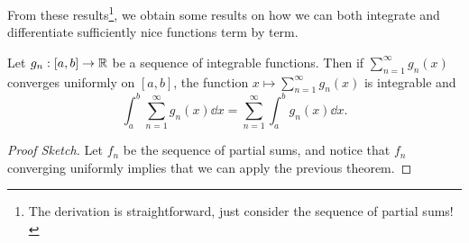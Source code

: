 \documentclass[a4paper]{scrartcl}
\begin{document}
From these results\footnote{The derivation is straightforward, just consider the sequence of partial sums!}, we obtain some results on how we can both integrate and differentiate sufficiently nice functions term by term.

\begin{theorem}
    Let $g_n: [a, b] \rightarrow \mathbb{R}$ be a sequence of integrable functions. Then if $\sum_{n = 1}^{\infty} g_n(x)$ converges uniformly on $[a, b]$, the function $x \mapsto \sum_{n = 1}^{\infty} g_n(x)$ is integrable and
    $$
    \int_a^b \sum_{n = 1}^{\infty} g_n(x) \dd x = \sum_{n = 1}^{\infty} \int_a^b g_n(x) \dd x.
    $$
\end{theorem}
\begin{proof}[Proof Sketch]
    Let $f_n$ be the sequence of partial sums, and notice that $f_n$ converging uniformly implies that we can apply the previous theorem.
\end{proof}
\end{document}
